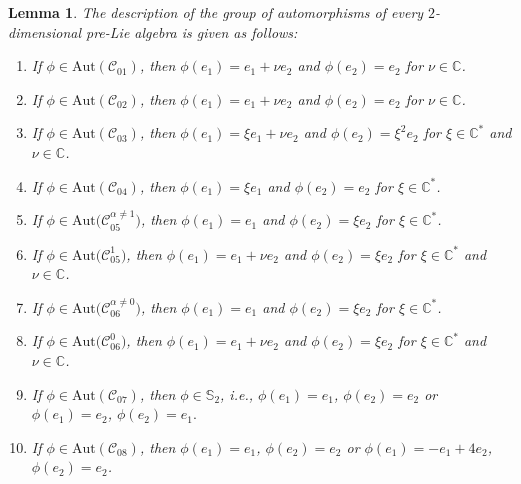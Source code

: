 \documentclass[10pt,a4paper]{amsart}
\numberwithin{equation}{section}
\newtheorem{Lemma}[Theorem]{Lemma}
\begin{document}
\begin{Lemma}
\label{pre-Lie aut} The description of the group of automorphisms of every $2
$-dimensional pre-Lie algebra is given as follows:
\begin{enumerate}\itemsep=0pt
\item[$(1)$] If $\phi \in \mathrm{Aut}(\mathcal{C}_{01})$, then $\phi
(e_{1})=e_{1}+\nu e_{2}$ and $\phi (e_{2})=e_{2}$ for $\nu \in \mathbb{C}$.

\item[$(2)$] If $\phi \in \mathrm{Aut}(\mathcal{C}_{02})$, then $\phi
(e_{1})=e_{1}+\nu e_{2}$ and $\phi (e_{2})=e_{2}$ for $\nu \in \mathbb{C}$.

\item[$(3)$] If $\phi \in \mathrm{Aut}(\mathcal{C}_{03})$, then $\phi (e_{1})=\xi
e_{1}+\nu e_{2}$ and $\phi (e_{2})=\xi ^{2}e_{2}$ for $\xi \in \mathbb{C}%
^{\ast }$ and $\nu \in \mathbb{C}$.

\item[$(4)$] If $\phi \in \mathrm{Aut}(\mathcal{C}_{04})$, then $\phi (e_{1})=\xi
e_{1}$ and $\phi (e_{2})=e_{2}$ for $\xi \in \mathbb{C}^{\ast }$.

\item[$(5)$] If $\phi \in \mathrm{Aut}\bigl(\mathcal{C}_{05}^{\alpha \neq 1}\bigr)$, then $%
\phi (e_{1})=e_{1}$ and $\phi (e_{2})=\xi e_{2}$ for $\xi \in \mathbb{C}%
^{\ast }$.

\item[$(6)$] If $\phi \in \mathrm{Aut}\bigl(\mathcal{C}_{05}^{1}\bigr)$, then $\phi
(e_{1})=e_{1}+\nu e_{2}$ and $\phi (e_{2})=\xi e_{2}$ for $\xi \in \mathbb{C%
}^{\ast }$ and $\nu \in \mathbb{C}$.

\item[$(7)$] If $\phi \in \mathrm{Aut}\bigl(\mathcal{C}_{06}^{\alpha \neq 0}\bigr)$, then $%
\phi (e_{1})=e_{1}$ and $\phi (e_{2})=\xi e_{2}$ for $\xi \in \mathbb{C}%
^{\ast }$.

\item[$(8)$] If $\phi \in \mathrm{Aut}\bigl(\mathcal{C}_{06}^{0}\bigr)$, then $\phi
(e_{1})=e_{1}+\nu e_{2}$ and $\phi (e_{2})=\xi e_{2}$ for $\xi \in \mathbb{C%
}^{\ast }$ and $\nu \in \mathbb{C}$.

\item[$(9)$] If $\phi \in \mathrm{Aut}(\mathcal{C}_{07})$, then $\phi \in \mathbb{S}%
_{2}$, i.e., $\phi (e_{1})=e_{1}$, $ \phi (e_{2})=e_{2}$ or $\phi
(e_{1})=e_{2}$, $ \phi (e_{2})=e_{1}.$

\item[$(10)$] If $\phi \in \mathrm{Aut}(\mathcal{C}_{08})$, then $\phi
(e_{1})=e_{1}$, $\phi (e_{2})=e_{2}$ or $\phi (e_{1})=-e_{1}+4e_{2}$, $\phi
(e_{2})=e_{2}$.
\end{enumerate}
\end{Lemma}
\end{document}

